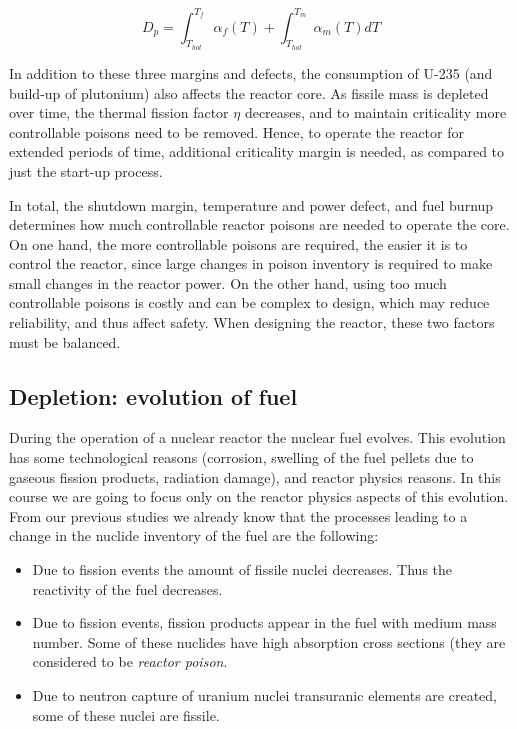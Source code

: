 \begin{equation} \label{eq:D_p}
D_p = \int_{T_{hot}}^{T_f}\alpha_f(T) + \int_{T_{hot}}^{T_m}\alpha_m(T)dT
\end{equation}

In addition to these three margins and defects, the consumption of U-235 (and build-up of plutonium) also affects the reactor core. As fissile mass is depleted over time, the thermal fission factor $\eta$ decreases, and to maintain criticality more controllable poisons need to be removed. Hence, to operate the reactor for extended periods of time, additional criticality margin is needed, as compared to just the start-up process.

In total, the shutdown margin, temperature and power defect, and fuel burnup determines how much controllable reactor poisons are needed to operate the core. On one hand, the more controllable poisons are required, the easier it is to control the reactor, since large changes in poison inventory is required to make small changes in the reactor power. On the other hand, using too much controllable poisons is costly and can be complex to design, which may reduce reliability, and thus affect safety. When designing the reactor, these two factors must be balanced.


\subsection{Depletion: evolution of fuel}

During the operation of a nuclear reactor the nuclear fuel evolves. This evolution has some technological reasons (corrosion, swelling of the fuel pellets due to gaseous fission products, radiation damage), and reactor physics reasons. In this course we are going to focus only on the reactor physics aspects of this evolution. From our previous studies we already know that the processes leading to a change in the nuclide inventory of the fuel are the following:

\begin{itemize}
\item Due to fission events the amount of fissile nuclei decreases. Thus the reactivity of the fuel decreases.
\item Due to fission events, fission products appear in the fuel with medium mass number. Some of these nuclides have high absorption cross sections (they are considered to be \textit{reactor poison}.
\item Due to neutron capture of uranium nuclei transuranic elements are created, some of these nuclei are fissile.
\end{itemize}

